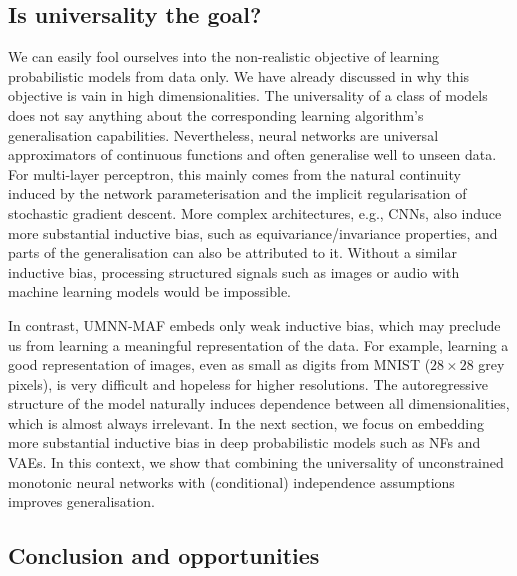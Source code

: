 \subsection{Is universality the goal?}
We can easily fool ourselves into the non-realistic objective of learning probabilistic models from data only. We have already discussed in  why this objective is vain in high dimensionalities. The universality of a class of models does not say anything about the corresponding learning algorithm's generalisation capabilities. Nevertheless, neural networks are universal approximators of continuous functions and often generalise well to unseen data. For multi-layer perceptron, this mainly comes from the natural continuity induced by the network parameterisation and the implicit regularisation of stochastic gradient descent. More complex architectures, e.g., CNNs, also induce more substantial inductive bias, such as equivariance/invariance properties, and parts of the generalisation can also be attributed to it. Without a similar inductive bias, processing structured signals such as images or audio with machine learning models would be impossible.

In contrast, UMNN-MAF embeds only weak inductive bias, which may preclude us from learning a meaningful representation of the data. For example, learning a good representation of images, even as small as digits from MNIST ($28 \times 28$ grey pixels), is very difficult and hopeless for higher resolutions. The autoregressive structure of the model naturally induces dependence between all dimensionalities, which is almost always irrelevant. In the next section, we focus on embedding more substantial inductive bias in deep probabilistic models such as NFs and VAEs. In this context, we show that combining the universality of unconstrained monotonic neural networks with (conditional) independence assumptions improves generalisation.


\subsection{Conclusion and opportunities}


